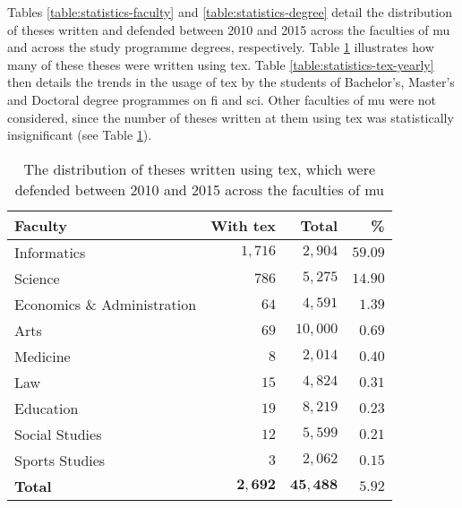 Tables \ref{table:statistics-faculty} and \ref{table:statistics-degree} detail the distribution of theses written and defended between 2010 and 2015 across the faculties of \gls{mu} and across the study programme degrees, respectively. Table \ref{table:statistics-tex} illustrates how many of these theses were written using \gls{tex}. Table \ref{table:statistics-tex-yearly} then details the trends in the usage of \gls{tex} by the students of Bachelor's, Master's and Doctoral degree programmes on \gls{fi} and \gls{sci}. Other faculties of \gls{mu} were not considered, since the number of theses written at them using \gls{tex} was statistically insignificant (see Table \ref{table:statistics-tex}).

\begin{table}
  \caption{The distribution of theses written using \gls{tex}, which were defended between 2010 and 2015 across the faculties of \acrshort{mu}}
  \begin{tabularx}{\textwidth}{Xrrr}
    \textbf{Faculty} & \textbf{With \gls{tex}} & \textbf{Total} & \textbf{\%} \\
    \hline
    Informatics                 & $1{,}716$ & $2{,}904$  & $59.09$ \\%
    Science                     & $786$     & $5{,}275$  & $14.90$ \\%
    Economics \& Administration & $64$      & $4{,}591$  & $1.39$  \\%
    Arts                        & $69$      & $10{,}000$ & $0.69$  \\%
    Medicine                    & $8$       & $2{,}014$  & $0.40$  \\%
    Law                         & $15$      & $4{,}824$  & $0.31$  \\%
    Education                   & $19$      & $8{,}219$  & $0.23$  \\%
    Social Studies              & $12$      & $5{,}599$  & $0.21$  \\%
    Sports Studies              & $3$       & $2{,}062$  & $0.15$  \\%
    \hline
    \textbf{Total} & $\mathbf{2{,}692}$ & $\mathbf{45{,}488}$ & $\mathbf{5.92}$
  \end{tabularx}
  \label{table:statistics-tex}
\end{table}

